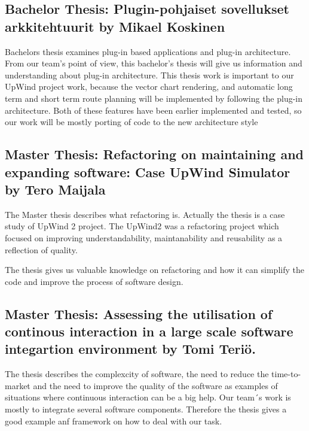 \documentclass[12pt,titlepage]{report}
\begin{document}
\subsection{Bachelor Thesis: Plugin-pohjaiset sovellukset arkkitehtuurit by Mikael Koskinen}

Bachelors thesis examines plug-in based applications and plug-in architecture.
From our team’s point of view, this bachelor’s thesis will give us information and understanding about plug-in architecture.
This thesis work is important to our UpWind project work, because the vector chart rendering, and automatic long term and short term route planning will be implemented by following the plug-in architecture.
Both of these features have been earlier implemented and tested, so our work will be mostly porting of code to the new architecture style

\subsection{Master Thesis: Refactoring on maintaining and expanding software: Case UpWind Simulator by Tero Maijala}

The Master thesis describes what refactoring is.
Actually the thesis is a case study of UpWind 2 project.
The UpWind2 was a refactoring project which focused on improving understandability, maintanability and reusability as a reflection of quality.

The thesis gives us valuable knowledge on refactoring and how it can simplify the code and improve the process of software design.

\subsection{Master Thesis: Assessing the utilisation of continous interaction in a large scale software integartion environment by Tomi Teriö.}

The thesis describes the complexcity of software, the need to reduce the time-to-market and the need to improve the quality of the software as examples of situations where continuous interaction can be a big help.
Our team´s work is mostly to integrate several software components.
Therefore the thesis gives a good example anf framework on how to deal with our task.



\end{document}
